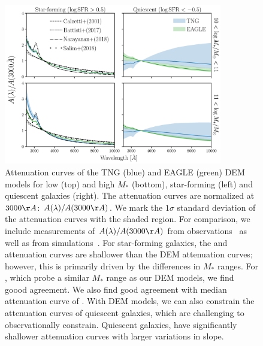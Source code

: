 \begin{figure}
\begin{center}
    \includegraphics[width=0.85\textwidth]{figs/abc_attenuation.pdf}
    \caption{\label{fig:atten}
    Attenuation curves of the TNG (blue) and EAGLE (green) DEM models for 
    low (top) and high $M_*$ (bottom), star-forming (left) and
    quiescent galaxies (right). The attenuation curves are normalized at
    $3000\AA$: $A(\lambda)/A(3000\AA)$. We mark the $1\sigma$ standard
    deviation of the attenuation curves with the shaded region. For comparison,
    we include measurements of $A(\lambda)/A(3000\AA)$ from 
    observations~\citep{caleztti2000, battisti2017, salim2018} as well as
    from simulations~\citep{narayanan2018}. For star-forming galaxies, the 
    \cite{calzetti2000} and \cite{battisti2017} attenuation curves are shallower 
    than the DEM attenuation curves; however, this is primarily driven by the
    differences in $M_*$ ranges. For \cite{salim2018}, which probe a similar
    $M_*$ range as our DEM models, we find goood agreement. We also find good 
    agreement with median attenuation curve of \cite{narayanan2018}. With DEM
    models, we can also constrain the attenuation curves of quiescent galaxies,
    which are challenging to observationally constrain. Quiescent galaxies,
    have significantly shallower attenuation curves with larger variations in
    slope. 
    }
\end{center}
\end{figure}

